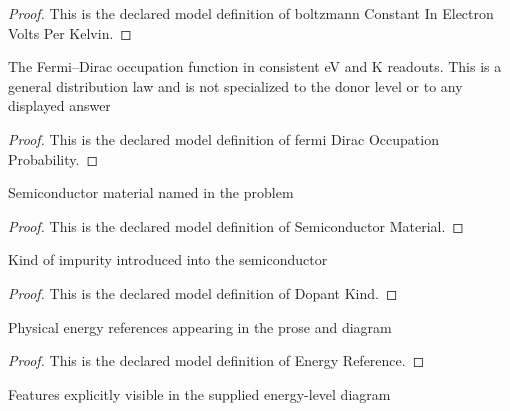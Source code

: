 \begin{proof}
  This is the declared model definition of boltzmann Constant In Electron Volts Per Kelvin.
\end{proof}
\begin{definition}
  \label{def:physics:phyx-mini-0575:phyxminiproblems-problemphyxmini0575-fermidiracoccupationprobability}
  The Fermi--Dirac occupation function in consistent eV and K readouts. This is a general distribution law and is not specialized to the donor level or to any displayed answer
\end{definition}
\begin{proof}
  This is the declared model definition of fermi Dirac Occupation Probability.
\end{proof}
\begin{definition}
  \label{def:physics:phyx-mini-0575:phyxminiproblems-problemphyxmini0575-semiconductormaterial}
  Semiconductor material named in the problem
\end{definition}
\begin{proof}
  This is the declared model definition of Semiconductor Material.
\end{proof}
\begin{definition}
  \label{def:physics:phyx-mini-0575:phyxminiproblems-problemphyxmini0575-dopantkind}
  Kind of impurity introduced into the semiconductor
\end{definition}
\begin{proof}
  This is the declared model definition of Dopant Kind.
\end{proof}
\begin{definition}
  \label{def:physics:phyx-mini-0575:phyxminiproblems-problemphyxmini0575-energyreference}
  Physical energy references appearing in the prose and diagram
\end{definition}
\begin{proof}
  This is the declared model definition of Energy Reference.
\end{proof}
\begin{definition}
  \label{def:physics:phyx-mini-0575:phyxminiproblems-problemphyxmini0575-diagramfeature}
  Features explicitly visible in the supplied energy-level diagram
\end{definition}
